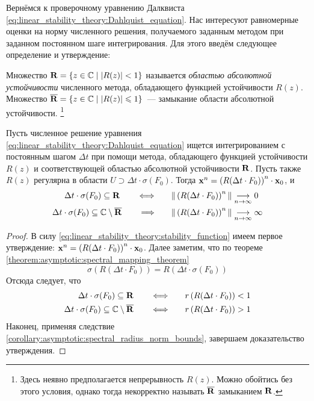 Вернёмся к проверочному уравнению Далквиста \eqref{eq:linear_stability_theory:Dahlquist_equation}.
Нас интересуют равномерные оценки на норму численного решения, получаемого заданным методом при заданном постоянном шаге интегрирования.
Для этого введём следующее определение и утверждение:

\begin{definition}
    \label{definition:asymptotic:stability_region}
    Множество $ \mathbf{R} = \{ z \in \mathbb{C} \mid | R(z) | < 1 \} $ называется \emph{областью абсолютной устойчивости} численного метода, обладающего функцией устойчивости $ R(z) $.
    Множество $ \overline{\mathbf{R}} = \{ z \in \mathbb{C} \mid | R(z) | \leqslant 1 \} $~--- замыкание области абсолютной устойчивости.%
    \footnote{Здесь неявно предполагается непрерывность $ R(z) $.
    Можно обойтись без этого условия, однако тогда некорректно называть $ \overline{\mathbf{R}} $ замыканием $ \mathbf{R} $.}
\end{definition}

\begin{statement}
    \label{statement:asymptotic:linear_numerical_stability}
    Пусть численное решение уравнения \eqref{eq:linear_stability_theory:Dahlquist_equation}
    ищется интегрированием с постоянным шагом $ \Delta t $
    при помощи метода, обладающего функцией устойчивости $ R(z) $ и соответствующей областью абсолютной устойчивости $ \mathbf{R} $.
    Пусть также $ R(z) $ регулярна в области $ U \supset \Delta t \cdot \sigma(F_0) $.
    Тогда $ \mathbf{x}^n = \left( R(\Delta t \cdot F_0) \right)^n \cdot \mathbf{x}_0 $, и
    \begin{align}
        \Delta t \cdot \sigma(F_0) \subseteq \mathbf{R} \qquad \Longleftrightarrow \qquad & \| \left( R(\Delta t \cdot F_0) \right)^n \| \underset{n \to \infty}{\longrightarrow} 0 \\
        \Delta t \cdot \sigma(F_0) \subseteq \mathbb{C} \setminus \overline{\mathbf{R}} \qquad \Longrightarrow \qquad & \| \left( R(\Delta t \cdot F_0) \right)^n \| \underset{n \to \infty}{\longrightarrow} \infty
    \end{align}
\end{statement}

\begin{proof}
    В силу \eqref{eq:linear_stability_theory:stability_function} имеем первое утверждение:
    $ \mathbf{x}^n = \left( R(\Delta t \cdot F_0) \right)^n \cdot \mathbf{x}_0 $.
    Далее заметим, что по теореме \ref{theorem:asymptotic:spectral_mapping_theorem}
    \[
        \sigma\left( R(\Delta t \cdot F_0) \right) = R\left( \Delta t \cdot \sigma(F_0) \right)
    \]
    Отсюда следует, что
    \begin{align}
        \Delta t \cdot \sigma(F_0) \subseteq \mathbf{R} \qquad \Longleftrightarrow \qquad & r\left( R(\Delta t \cdot F_0) \right) < 1 \\
        \Delta t \cdot \sigma(F_0) \subseteq \mathbb{C} \setminus \overline{\mathbf{R}} \qquad \Longleftrightarrow \qquad & r\left( R(\Delta t \cdot F_0) \right) > 1
    \end{align}
    Наконец, применяя следствие \ref{corollary:asymptotic:spectral_radius_norm_bounds}, завершаем доказательство утверждения.
\end{proof}

